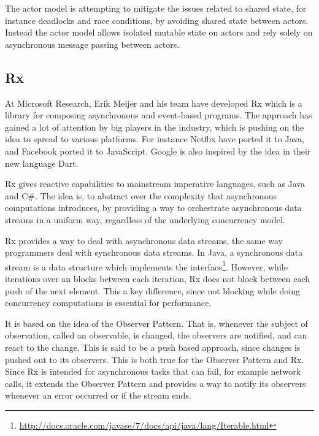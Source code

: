 The actor model is attempting to mitigate the issues related to shared state, for instance deadlocks and race conditions, by avoiding shared state between actors\citep[Chap. 32]{odersky2011programming}. Instead the actor model allows isolated mutable state on actors and rely solely on asynchronous message passing between actors.

\subsection{\acl{Rx}}
At Microsoft Research, Erik Meijer and his team have developed \ac{Rx} which is a library for composing asynchronous and event-based programs. The approach has gained a lot of attention by big players in the industry, which is pushing on the idea to spread to various platforms. For instance Netflix have ported it to Java\cite{RxJava}, and Facebook ported it to JavaScript\cite{react}. Google is also inspired by the idea in their new language Dart\cite{dart}.

\ac{Rx} gives reactive capabilities to mainstream imperative languages, such as Java and C\#\cite{csharp}. The idea is, to abstract over the complexity that asynchronous computations introduces, by providing a way to orchestrate asynchronous data streams in a uniform way, regardless of the underlying concurrency model.

\ac{Rx} provides a way to deal with asynchronous data streams, the same way programmers deal with synchronous data streams. In Java, a synchronous data stream is a data structure which implements the  interface\footnote{\url{http://docs.oracle.com/javase/7/docs/api/java/lang/Iterable.html}}. However, while iterations over an  blocks between each iteration, \ac{Rx} does not block between each push of the next element. This a key difference, since not blocking while doing concurrency computations is essential for performance.

It is based on the idea of the Observer Pattern\cite{gamma1994design}. That is, whenever the subject of observation, called an observable, is changed, the observers are notified, and can react to the change. This is said to be a push based approach, since changes is pushed out to its observers. This is both true for the Observer Pattern and \ac{Rx}. Since \ac{Rx} is intended for asynchronous tasks that can fail, for example network calls, it extends the Observer Pattern and provides a way to notify its observers whenever an error occurred or if the stream ends.

